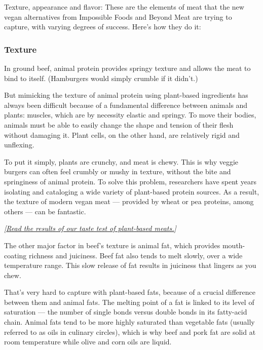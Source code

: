 Texture, appearance and flavor: These are the elements of meat that the
new vegan alternatives from Impossible Foods and Beyond Meat are trying
to capture, with varying degrees of success. Here's how they do it:

\hypertarget{texture}{%
\subsubsection{Texture}\label{texture}}

In ground beef, animal protein provides springy texture and allows the
meat to bind to itself. (Hamburgers would simply crumble if it didn't.)

But mimicking the texture of animal protein using plant-based
ingredients has always been difficult because of a fundamental
difference between animals and plants: muscles, which are by necessity
elastic and springy. To move their bodies, animals must be able to
easily change the shape and tension of their flesh without damaging it.
Plant cells, on the other hand, are relatively rigid and unflexing.

To put it simply, plants are crunchy, and meat is chewy. This is why
veggie burgers can often feel crumbly or mushy in texture, without the
bite and springiness of animal protein. To solve this problem,
researchers have spent years isolating and cataloging a wide variety of
plant-based protein sources. As a result, the texture of modern vegan
meat --- provided by wheat or pea proteins, among others --- can be
fantastic.

\emph{{[}}\href{https://www.nytimes3xbfgragh.onion/2019/10/22/dining/veggie-burger-taste-test.html}{\emph{Read
the results of our taste test of plant-based meats.}}\emph{{]}}

The other major factor in beef's texture is animal fat, which provides
mouth-coating richness and juiciness. Beef fat also tends to melt
slowly, over a wide temperature range. This slow release of fat results
in juiciness that lingers as you chew.

That's very hard to capture with plant-based fats, because of a crucial
difference between them and animal fats. The melting point of a fat is
linked to its level of saturation --- the number of single bonds versus
double bonds in its fatty-acid chain. Animal fats tend to be more highly
saturated than vegetable fats (usually referred to as oils in culinary
circles), which is why beef and pork fat are solid at room temperature
while olive and corn oils are liquid.

